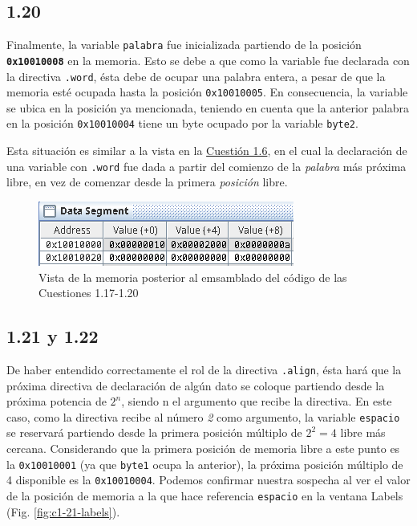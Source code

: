 \documentclass[a4paper]{report}
\begin{document}
\subsection*{1.20}

Finalmente, la variable \texttt{palabra} fue inicializada partiendo de la posición \texttt{\textbf{0x10010008}} en la memoria. Esto se debe a que como la variable fue declarada con la directiva \texttt{.word}, ésta debe de ocupar una palabra entera, a pesar de que la memoria esté ocupada hasta la posición \texttt{0x10010005}. En consecuencia, la variable se ubica en la posición ya mencionada, teniendo en cuenta que la anterior palabra en la posición \texttt{0x10010004} tiene un byte ocupado por la variable \texttt{byte2}.

Esta situación es similar a la vista en la \hyperref[sec:c1-6]{Cuestión 1.6}, en el cual la declaración de una variable con \texttt{.word} fue dada a partir del comienzo de la \textit{palabra} más próxima libre, en vez de comenzar desde la primera \textit{posición} libre.

\begin{figure}[H]
    \centering
    \captionsetup{justification = centering}
    \includegraphics[width=.5\linewidth]{img/c1-17}
    \caption{Vista de la memoria posterior al emsamblado del código de las Cuestiones 1.17-1.20}
\end{figure}

\subsection*{1.21 y 1.22}

De haber entendido correctamente el rol de la directiva \texttt{.align}, ésta hará que la próxima directiva de declaración de algún dato se coloque partiendo desde la próxima potencia de $2^n$, siendo n el argumento que recibe la directiva. En este caso, como la directiva recibe al número \textit{2} como argumento, la variable \texttt{espacio} se reservará partiendo desde la primera posición múltiplo de $2^2 = 4$ libre más cercana. Considerando que la primera posición de memoria libre a este punto es la \texttt{0x10010001} (ya que \texttt{byte1} ocupa la anterior), la próxima posición múltiplo de 4 disponible es la \texttt{0x10010004}. Podemos confirmar nuestra sospecha al ver el valor de la posición de memoria a la que hace referencia \texttt{espacio} en la ventana Labels (Fig. \ref{fig:c1-21-labels}).
\end{document}
